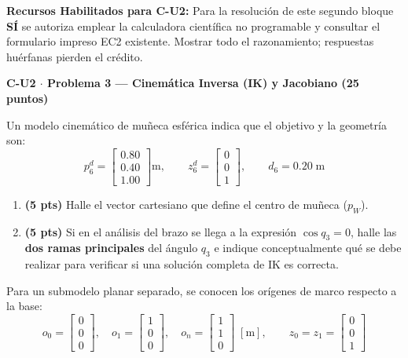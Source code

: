 \documentclass[11pt, a4paper]{article}
\begin{document}
\vspace{0.3cm}
\begin{tcolorbox}[colback=green!5, colframe=green!50!black, left=2mm, right=2mm, top=1mm, bottom=1mm]
    \small\textbf{Recursos Habilitados para C-U2:} Para la resolución de este segundo bloque \textbf{SÍ} se autoriza emplear la calculadora científica no programable y consultar el formulario impreso EC2 existente. Mostrar todo el razonamiento; respuestas huérfanas pierden el crédito.
\end{tcolorbox}

\vspace{0.3cm}
\noindent\textbf{\large C-U2 $\cdot$ Problema 3 — Cinemática Inversa (IK) y Jacobiano (25 puntos)}

Un modelo cinemático de muñeca esférica indica que el objetivo y la geometría son:
\begin{equation*}
    p_6^d = \begin{bmatrix} 0.80 \\ 0.40 \\ 1.00 \end{bmatrix}\mathrm{m}, \qquad z_6^d = \begin{bmatrix} 0 \\ 0 \\ 1 \end{bmatrix}, \qquad d_6 = 0.20\;\mathrm{m}
\end{equation*}

\begin{enumerate}
    \item \textbf{(5 pts)} Halle el vector cartesiano que define el centro de muñeca ($p_W$).
    \item \textbf{(5 pts)} Si en el análisis del brazo se llega a la expresión $\cos q_3 = 0$, halle las \textbf{dos ramas principales} del ángulo $q_3$ e indique conceptualmente qué se debe realizar para verificar si una solución completa de IK es correcta.
\end{enumerate}

Para un submodelo planar separado, se conocen los orígenes de marco respecto a la base:
\begin{equation*}
    o_0 = \begin{bmatrix} 0 \\ 0 \\ 0 \end{bmatrix},\quad o_1 = \begin{bmatrix} 1 \\ 0 \\ 0 \end{bmatrix},\quad o_n = \begin{bmatrix} 1 \\ 1 \\ 0 \end{bmatrix} \;[\mathrm{m}],\qquad z_0 = z_1 = \begin{bmatrix} 0 \\ 0 \\ 1 \end{bmatrix}
\end{equation*}
\end{document}
